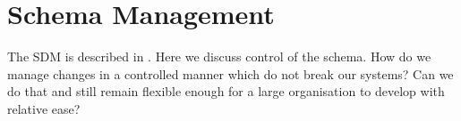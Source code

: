 \section{Schema Management}

The SDM is described in . Here we discuss control of the schema. How do we manage changes in a controlled manner which do not break our systems? Can we do that and still remain flexible enough for a large organisation to develop with relative ease?
